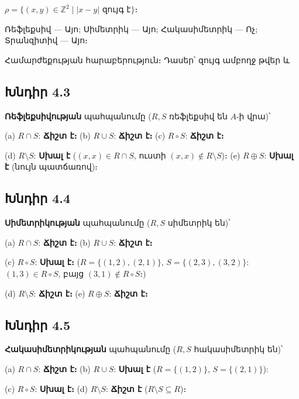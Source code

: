 $\rho=\{(x,y)\in\mathbb{Z}^2\mid |x-y|\text{ զույգ է}\}$։

Ռեֆլեքսիվ — Այո; Սիմետրիկ — Այո; Հակասիմետրիկ — Ոչ; Տրանզիտիվ — Այո։

$\boxed{\text{Համարժեքության հարաբերություն։ Դասեր՝ զույգ ամբողջ թվեր և կենտ ամբողջ թվեր։}}$


\subsection*{Խնդիր 4.3}

\textbf{Ռեֆլեքսիվության} պահպանումը ($R,S$ ռեֆլեքսիվ են $A$-ի վրա)՝

(a) $R\cap S$: \textbf{Ճիշտ է։} \quad
(b) $R\cup S$: \textbf{Ճիշտ է։} \quad
(c) $R\circ S$: \textbf{Ճիշտ է։}

(d) $R\setminus S$: \textbf{Սխալ է} ($(x,x)\in R\cap S$, ուստի $(x,x)\notin R\setminus S$)։ \quad
(e) $R\oplus S$: \textbf{Սխալ է} (նույն պատճառով)։


\subsection*{Խնդիր 4.4}

\textbf{Սիմետրիկության} պահպանումը ($R,S$ սիմետրիկ են)՝

(a) $R\cap S$: \textbf{Ճիշտ է։} \quad
(b) $R\cup S$: \textbf{Ճիշտ է։}

(c) $R\circ S$: \textbf{Սխալ է։} ($R=\{(1,2),(2,1)\}$, $S=\{(2,3),(3,2)\}$: $(1,3)\in R\circ S$, բայց $(3,1)\notin R\circ S$։)

(d) $R\setminus S$: \textbf{Ճիշտ է։} \quad
(e) $R\oplus S$: \textbf{Ճիշտ է։}


\subsection*{Խնդիր 4.5}

\textbf{Հակասիմետրիկության} պահպանումը ($R,S$ հակասիմետրիկ են)՝

(a) $R\cap S$: \textbf{Ճիշտ է։} \quad
(b) $R\cup S$: \textbf{Սխալ է} ($R=\{(1,2)\}$, $S=\{(2,1)\}$):

(c) $R\circ S$: \textbf{Սխալ է։} \quad
(d) $R\setminus S$: \textbf{Ճիշտ է} ($R\setminus S\subseteq R$)։

